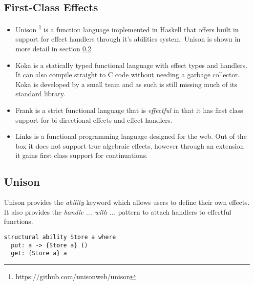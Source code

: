 \documentclass[logo,bsc,singlespacing,parskip]{infthesis}
\begin{document}
\subsection{First-Class Effects}

\begin{itemize}
        \item{Unison \footnote{https://github.com/unisonweb/unison} is a
function language implemented in Haskell that offers built in support for effect
handlers through it's abilities system. Unison is shown in more detail in section \ref{subsection:unison}}
        \item{Koka \cite{DBLP:journals/corr/Leijen14} is a statically typed
functional language with effect types and handlers. It can also compile
straight to C code without needing a garbage collector. Koka is developed by a
small team and as such is still missing much of its standard library.}
        \item{Frank \cite{DBLP:conf/popl/LindleyMM17} is a strict functional
language that is \emph{effectful} in that it has first class support for
bi-directional effects and effect handlers. }
        \item{Links \cite{DBLP:conf/fmco/CooperLWY06} is a functional
programming language designed for the web. Out of the box it does not support
true algebraic effects, however through an extension
\cite{DBLP:conf/icfp/HillerstromL16} it gains first class support for
continuations.}
\end{itemize}

\subsection{Unison}
\label{subsection:unison}

Unison provides the \emph{ability} keyword which allows users to define their own
effects. It also provides the \emph{handle ... with ...} pattern to attach handlers to effectful functions.

\begin{lstlisting}[caption={The \emph{put} and \emph{store} example in Unison. Note that the \emph{structural} keyword refers to the fact that Unison stores type definitions as a hash. Even if we changed all the variable names it would still view it as the same type. To avoid that behaviour you can swap the \emph{structural} keyword for \emph{unique}}]
structural ability Store a where
  put: a -> {Store a} ()
  get: {Store a} a
\end{lstlisting}
\end{document}
